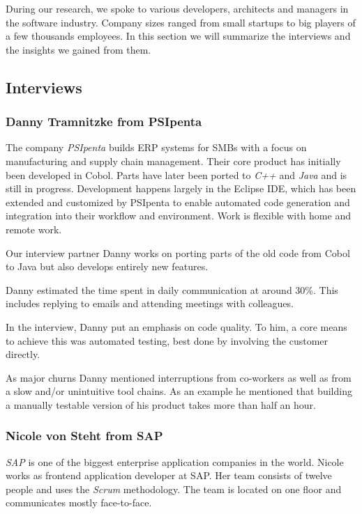 During our research, we spoke to various developers, architects and managers in the software industry. Company sizes ranged from small startups to big players of a few thousands employees. In this section we will summarize the interviews and the insights we gained from them.

\subsection{Interviews}
\subsubsection{Danny Tramnitzke from PSIpenta}
The company \emph{PSIpenta} builds ERP systems for SMBs with a focus on manufacturing and supply chain management. Their core product has initially been developed in Cobol. Parts have later been ported to \emph{C++} and \emph{Java} and is still in progress. Development happens largely in the Eclipse IDE, which has been extended and customized by PSIpenta to enable automated code generation and integration into their workflow and environment. Work is flexible with home and remote work.

Our interview partner Danny works on porting parts of the old code from Cobol to Java but also develops entirely new features.

Danny estimated the time spent in daily communication at around 30\%. This includes replying to emails and attending meetings with colleagues.

In the interview, Danny put an emphasis on code quality. To him, a core means to achieve this was automated testing, best done by involving the customer directly.

As major churns Danny mentioned interruptions from co-workers as well as from a slow and/or unintuitive tool chains. As an example he mentioned that building a manually testable version of his product takes more than half an hour.

\subsubsection{Nicole von Steht from SAP}
\emph{SAP} is one of the biggest enterprise application companies in the world. Nicole works as frontend application developer at SAP. Her team consists of twelve people and uses the \emph{Scrum} methodology. The team is located on one floor and communicates mostly face-to-face.

